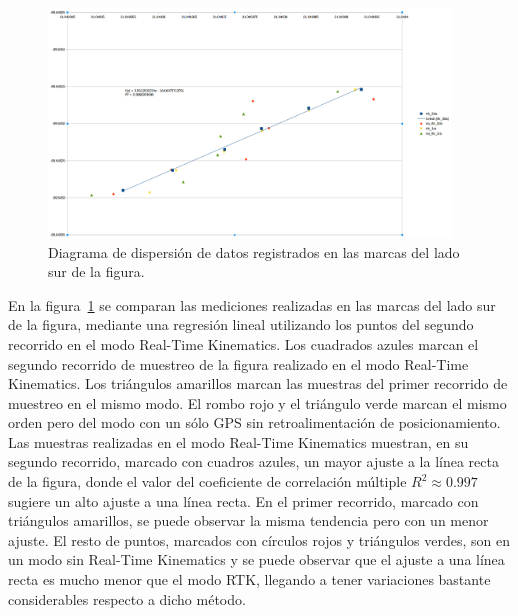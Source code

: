 \begin{figure}[H]
\centering
\includegraphics[width=0.95\textwidth]{Figures/Dispers}
\caption[Diagrama de dispersión de datos registrados en las marcas del lado sur de la figura.]{Diagrama de dispersión de datos registrados en las marcas del lado sur de la figura.}
\label{fig:Disp}
\end{figure}

En la figura~\ref{fig:Disp} se comparan las mediciones realizadas en las marcas del lado sur de la figura, mediante una regresión lineal utilizando los puntos del segundo recorrido en el modo Real-Time Kinematics. Los cuadrados azules marcan el segundo recorrido de muestreo de la figura realizado en el modo Real-Time Kinematics. Los triángulos amarillos marcan las muestras del primer recorrido de muestreo en el mismo modo. El rombo rojo y el triángulo verde marcan el mismo orden pero del modo con un sólo GPS sin retroalimentación de posicionamiento.\\

Las muestras realizadas en el modo Real-Time Kinematics muestran, en su segundo recorrido, marcado con cuadros azules, un mayor ajuste a la línea recta de la figura, donde el valor del coeficiente de correlación múltiple $R^{2} \approx 0.997$\footnotemark sugiere un alto ajuste a una línea recta. En el primer recorrido, marcado con triángulos amarillos, se puede observar la misma tendencia pero con un menor ajuste. El resto de puntos, marcados con círculos rojos y triángulos verdes, son en un modo sin Real-Time Kinematics y se puede observar que el ajuste a una línea recta es mucho menor que el modo RTK, llegando a tener variaciones bastante considerables respecto a dicho método.\\



